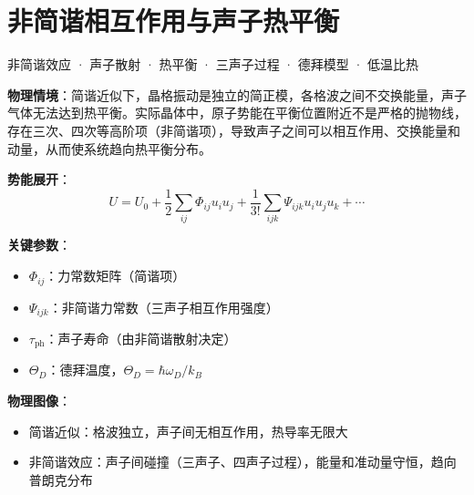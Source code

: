 
\section{非简谐相互作用与声子热平衡}
\label{sec:anharmonic-phonon}

\begin{tipbox}[关键词标签]
非简谐效应 · 声子散射 · 热平衡 · 三声子过程 · 德拜模型 · 低温比热
\end{tipbox}

\begin{modelbox}[模型：晶格的非简谐效应]
\textbf{物理情境}：简谐近似下，晶格振动是独立的简正模，各格波之间不交换能量，声子气体无法达到热平衡。实际晶体中，原子势能在平衡位置附近不是严格的抛物线，存在三次、四次等高阶项（非简谐项），导致声子之间可以相互作用、交换能量和动量，从而使系统趋向热平衡分布。

\textbf{势能展开}：
\[
U=U_0+\frac{1}{2}\sum_{ij}\Phi_{ij}u_iu_j+\frac{1}{3!}\sum_{ijk}\Psi_{ijk}u_iu_ju_k+\cdots
\]

\textbf{关键参数}：
\begin{itemize}[nosep]
    \item $\Phi_{ij}$：力常数矩阵（简谐项）
    \item $\Psi_{ijk}$：非简谐力常数（三声子相互作用强度）
    \item $\tau_{\text{ph}}$：声子寿命（由非简谐散射决定）
    \item $\Theta_D$：德拜温度，$\Theta_D=\hbar\omega_D/k_B$
\end{itemize}

\textbf{物理图像}：
\begin{itemize}[nosep]
    \item 简谐近似：格波独立，声子间无相互作用，热导率无限大
    \item 非简谐效应：声子间碰撞（三声子、四声子过程），能量和准动量守恒，趋向普朗克分布
\end{itemize}
\end{modelbox}

